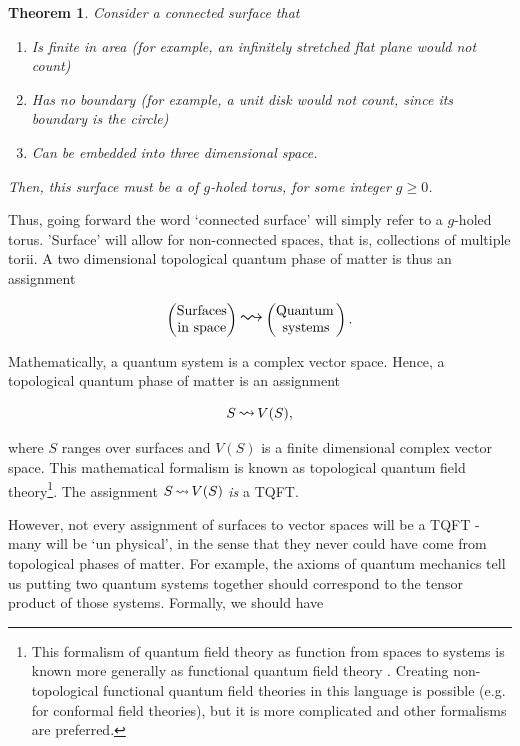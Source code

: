 \documentclass{article}
\newtheorem{theorem}{Theorem}[section]
\theoremstyle{definition}
\numberwithin{figure}{section}
\begin{document}
\begin{theorem} Consider a connected surface that

\begin{enumerate}
\item Is finite in area (for example, an infinitely stretched flat plane would not count)
\item Has no boundary (for example, a unit disk would not count, since its boundary is the circle)
\item Can be embedded into three dimensional space.
\end{enumerate}

Then, this surface must be a of $g$-holed torus, for some integer $g\geq 0$.
\end{theorem}

Thus, going forward the word `connected surface' will simply refer to a $g$-holed torus. 'Surface' will allow for non-connected spaces, that is, collections of multiple torii. A two dimensional topological quantum phase of matter is thus an assignment

$$
\begin{pmatrix}
\text{Surfaces} \\
\text{in space}
\end{pmatrix}
\bigleadsto
\begin{pmatrix}
\text{Quantum\,} \\ \text{systems}
\end{pmatrix}.
$$

Mathematically, a quantum system is a complex vector space. Hence, a topological quantum phase of matter is an assignment

$$S \,\mathlarger{\leadsto}\,V(S),$$

where $S$ ranges over surfaces and $V(S)$ is a finite dimensional complex vector space. This mathematical formalism is known as topological quantum field theory\footnote{This formalism of quantum field theory as function from spaces to systems is known more generally as functional quantum field theory \cite{stolz2014topology, schreiber2009aqft}. Creating non-topological functional quantum field theories in this language is possible (e.g. \cite{segal1988definition} for conformal field theories), but it is more complicated and other formalisms are preferred.}. The assignment $S \,\mathlarger{\leadsto}\,V(S)$ \textit{is} a TQFT.

However, not every assignment of surfaces to vector spaces will be a TQFT - many will be `un physical',  in the sense that they never could have come from topological phases of matter. For example, the axioms of quantum mechanics tell us putting two quantum systems together should correspond to the tensor product of those systems. Formally, we should have
\end{document}
